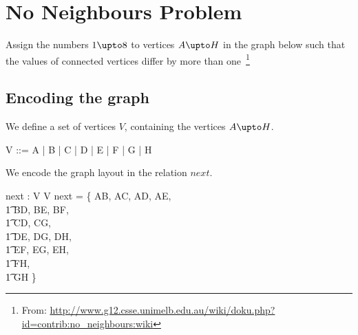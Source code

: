 \documentclass{article}
\begin{document}
\usetikzlibrary{positioning}

\section*{No Neighbours Problem}

Assign the numbers $1\upto 8$ to vertices $A\upto H$ in the graph 
below such that the values of connected vertices differ by more than one\
\footnote{From: \url{http://www.g12.csse.unimelb.edu.au/wiki/doku.php?id=contrib:no_neighbours:wiki}}

\begin{center}
\end{center}

\subsection*{Encoding the graph}
We define a set of vertices $V$, containing the vertices $A\upto H$.
\begin{zed}
  V ::= A | B | C | D | E | F | G | H
\end{zed}
We encode the graph layout in the relation $next$.
\begin{axdef}
  next : V \rel V
  \where
  next = \{ A\mapsto B, A\mapsto C, A\mapsto D, A\mapsto E, \\
  \t1 B\mapsto D, B\mapsto E, B\mapsto F, \\
  \t1 C\mapsto D, C\mapsto G, \\
  \t1 D\mapsto E, D\mapsto G, D\mapsto H, \\
  \t1 E\mapsto F, E\mapsto G, E\mapsto H, \\
  \t1 F\mapsto H, \\
  \t1 G\mapsto H \}
\end{axdef}
\end{document}
